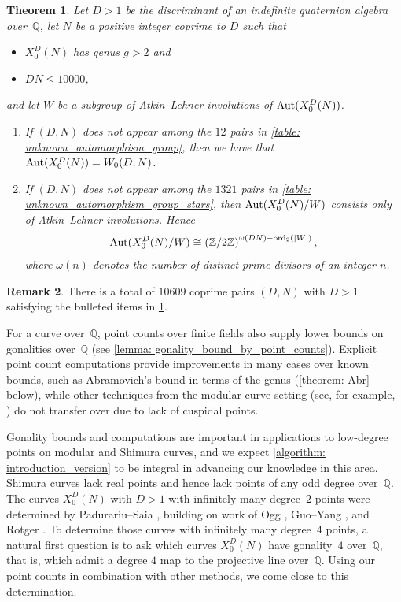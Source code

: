 \documentclass[11pt,reqno]{amsart}
\newcommand{\Q}{\mathbb{Q}}
\newcommand{\Z}{\mathbb{Z}}
\newcommand{\Aut}{{\rm Aut}}
\newtheorem{theorem}{Theorem}[section]
\theoremstyle{definition}
\newtheorem{remark}[theorem]{Remark}
\begin{document}
\begin{theorem}\label{theorem: all_atkin_lehner_introduction}
Let $D>1$ be the discriminant of an indefinite quaternion algebra over~$\Q$, let $N$ be a positive integer coprime to $D$ such that
\begin{itemize}
    \item $X_0^D(N)$ has genus $g > 2$ and 
    \item $DN \leq 10000$,
\end{itemize}
and let $W$ be a subgroup of Atkin--Lehner involutions of $\textnormal{Aut}(X_0^D(N))$.
\begin{enumerate}
    \item If $(D,N)$ does not appear among the $12$ pairs in \cref{table: unknown_automorphism_group}, then we have that $\Aut(X_0^D(N)) = W_0(D,N)$.
    \item If $(D,N)$ does not appear among the $1321$ pairs in \cref{table: unknown_automorphism_group_stars}, then $\Aut(X_0^D(N)/W)$ consists only of Atkin--Lehner involutions. Hence
\[ \Aut(X_0^D(N)/W) \cong \left(\Z/2\Z\right)^{\omega(DN) - \textnormal{ord}_2\left(|W|\right)} , \]
where $\omega(n)$ denotes the number of distinct prime divisors of an integer $n$. 
\end{enumerate}
\end{theorem}

\begin{remark}
There is a total of $10609$ coprime pairs $(D,N)$ with $D>1$ satisfying the bulleted items in \cref{theorem: all_atkin_lehner_introduction}.
\end{remark}

For a curve over~$\Q$, point counts over finite fields also supply lower bounds on gonalities over~$\Q$ (see \cref{lemma: gonality_bound_by_point_counts}). Explicit point count computations provide improvements in many cases over known bounds, such as Abramovich's bound in terms of the genus \cite{Abramovich96} (\cref{theorem: Abr} below), while other techniques from the modular curve setting (see, for example, \cite{DvH}) do not transfer over due to lack of cuspidal points.

Gonality bounds and computations are important in applications to low-degree points on modular and Shimura curves, and we expect \cref{algorithm: introduction_version} to be integral in advancing our knowledge in this area. Shimura curves lack real points \cite[Theorem 0]{Sh75} and hence lack points of any odd degree over~$\Q$. The curves $X_0^D(N)$ with $D>1$ with infinitely many degree~$2$ points were determined by Padurariu--Saia \cite[Theorem 6.3]{PS25}, building on work of Ogg \cite{Ogg83}, Guo--Yang \cite{GY17}, and Rotger \cite{Rotger02}. To determine those curves with infinitely many degree~$4$ points, a natural first question is to ask which curves $X_0^D(N)$ have gonality~$4$ over~$\Q$, that is, which admit a degree $4$ map to the projective line over~$\Q$. Using our point counts in combination with other methods, we come close to this determination. 
\end{document}
